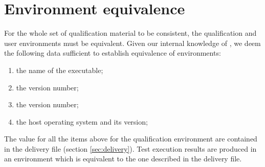 \documentclass {report}
\begin{document}
\section{Environment equivalence}
\label{sec:equivalence}

For the whole set of qualification material to be consistent, the
qualification and user environments must be equivalent.
%
Given our internal knowledge of \xcov{}, we deem the following data sufficient
to establish equivalence of environments:

\begin{enumerate}
\item the name of the \gnatp{} executable;
\item the \gnatp{} version number;
\item the \xcov{} version number;
\item the host operating system and its version;
\end{enumerate}

The value for all the items above for the qualification environment are
contained in the delivery file (section \ref{sec:delivery}). Test execution
results are produced in an environment which is equivalent to the one
described in the delivery file.
\end{document}
